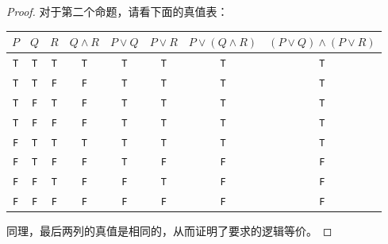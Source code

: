 \begin{proof}
    对于第二个命题，请看下面的真值表：
    \begin{center}
        \begin{tabular}{c|c|c|c|c|c|c|c}
              $P$ & $Q$ & $R$ & $Q \land R$ & $P \lor Q$  & $P \lor R$ & $P \lor (Q \land R)$ & $(P \lor Q) \land (P \lor R)$ \\
              \hline
              \verb|T| & \verb|T| & \verb|T| &  \verb|T|  &   \verb|T|   &\verb|T| &\verb|T| &   \verb|T|   \\
              \verb|T| & \verb|T| & \verb|F| &  \verb|F|  &   \verb|T|   &\verb|T| &\verb|T| &   \verb|T|   \\
              \verb|T| & \verb|F| & \verb|T| &  \verb|F|  &   \verb|T|   &\verb|T| &\verb|T| &   \verb|T|   \\
              \verb|T| & \verb|F| & \verb|F| &  \verb|F|  &   \verb|T|   &\verb|T| &\verb|T| &   \verb|T|   \\
              \verb|F| & \verb|T| & \verb|T| &  \verb|T|  &   \verb|T|   &\verb|T| &\verb|T| &   \verb|T|   \\
              \verb|F| & \verb|T| & \verb|F| &  \verb|F|  &   \verb|T|   &\verb|F| &\verb|F| &   \verb|F|   \\
              \verb|F| & \verb|F| & \verb|T| &  \verb|F|  &   \verb|F|   &\verb|T| &\verb|F| &   \verb|F|   \\
              \verb|F| & \verb|F| & \verb|F| &  \verb|F|  &   \verb|F|   &\verb|F| &\verb|F| &   \verb|F|   \\
        \end{tabular}
    \end{center}

    同理，最后两列的真值是相同的，从而证明了要求的逻辑等价。
\end{proof}
